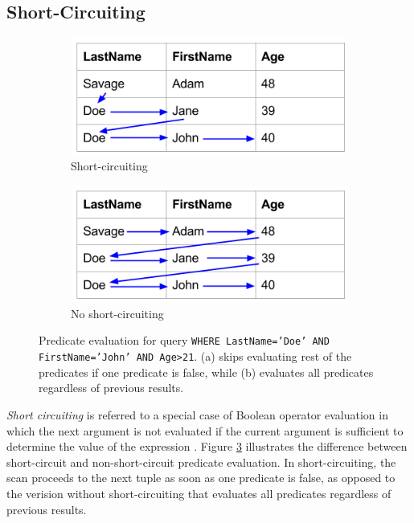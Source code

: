 \subsection{Short-Circuiting}
\label{sub:Short-Circuiting}
\begin{figure}
  \centering
  \begin{subfigure}{0.45\textwidth}
    \includegraphics[width=\textwidth]{img/short-circuiting-1.png}
    \caption{Short-circuiting}
    \label{fig:short-circuiting-1} 
  \end{subfigure}
  \begin{subfigure}{0.45\textwidth}
    \includegraphics[width=\textwidth]{img/short-circuiting-2.png}
    \caption{No short-circuiting}
    \label{fig:short-circuiting-2} 
  \end{subfigure}
  \caption{Predicate evaluation for query \texttt{WHERE LastName='Doe' AND FirstName='John' AND Age>21}. (a) skips evaluating rest of the predicates if one predicate is false, while (b) evaluates all predicates regardless of previous results.}
  \label{fig:short-circuiting} 
\end{figure}
\textit{Short circuiting} is referred to a special case of Boolean operator evaluation in which the next argument is not evaluated if the current argument is sufficient to determine the value of the expression \cite{Wikipedia_contributors2015-rk}. Figure \ref{fig:short-circuiting} illustrates the difference between short-circuit and non-short-circuit predicate evaluation. In short-circuiting, the scan proceeds to the next tuple as soon as one predicate is false, as opposed to the verision without short-circuiting that evaluates all predicates regardless of previous results.


